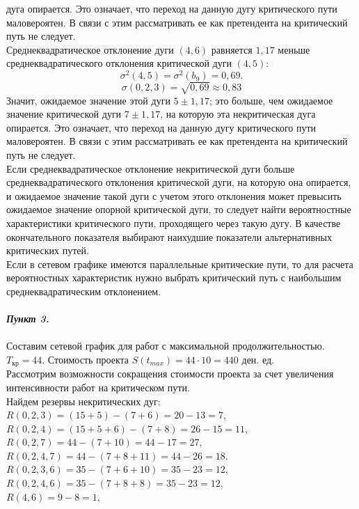 \documentclass[a4paper, 12pt]{report}
\begin{document}
	дуга опирается. Это означает, что переход на данную дугу критического пути маловероятен. В связи с этим рассматривать ее как претендента на критический путь не следует.\\
	Среднеквадратическое отклонение дуги $(4,6)$ равняется $1,17$ меньше
	среднеквадратического отклонения критической дуги $(4,5)$:
	$$\sigma^2(4,5)=\sigma^2(b_9)=0,69.$$
	$$\sigma(0,2,3)=\sqrt{0,69}\approx 0,83$$ Значит,
	ожидаемое значение этой дуги $5 \pm 1,17$; это больше, чем ожидаемое
	значение критической дуги $7 \pm 1,17$, на которую эта некритическая
	дуга опирается. Это означает, что переход на данную дугу критического пути маловероятен. В связи с этим рассматривать ее как претендента на критический путь не следует.\\
	Если среднеквадратическое отклонение некритической дуги
	больше среднеквадратического отклонения критической дуги, на которую она опирается, и ожидаемое значение такой дуги с учетом этого отклонения может превысить ожидаемое значение опорной критической дуги, то следует найти вероятностные характеристики
	критического пути, проходящего через такую дугу. В качестве окончательного показателя выбирают наихудшие показатели альтернативных критических путей.\\
	Если в сетевом графике имеются параллельные критические пути,
	то для расчета вероятностных характеристик нужно выбрать критический путь с наибольшим среднеквадратическим отклонением.\\\\
	\textbf{\textit{Пункт 3.}}\\\\
	Составим сетевой график для работ с максимальной продолжительностью.
	$T_\text{кр}=44$. Стоимость проекта $S(t_{max})=44\cdot 10=440$ ден. ед.\\
	Рассмотрим возможности сокращения стоимости проекта за счет
	увеличения интенсивности работ на критическом пути.\\
	Найдем резервы некритических дуг: \\
	$R(0,2,3)=(15+5)-(7+6)=20-13=7$,\\
	$R(0,2,4)=(15+5+6)-(7+8)=26-15=11$,\\
	$R(0,2,7)=44-(7+10)=44-17=27$,\\
	$R(0,2,4,7)=44-(7+8+11)=44-26=18$.\\
	$R(0,2,3,6)=35-(7+6+10)=35-23=12$,\\
	$R(0,2,4,6)=35-(7+8+8)=35-23=12$,\\
	$R(4,6)=9-8=1$,\\
\end{document}
